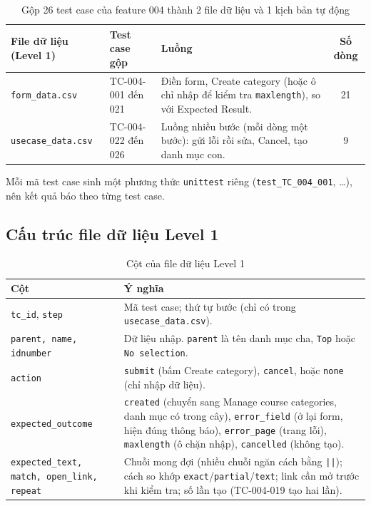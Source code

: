 \documentclass[12pt,a4paper]{article}
\begin{document}
\begin{table}[H]
\centering\small
\begin{tabular}{|L{4.0cm}|L{2.9cm}|L{4.9cm}|c|}
\hline
{}\textbf{File dữ liệu (Level 1)} & \textbf{Test case gộp} & \textbf{Luồng} & \textbf{Số dòng} \\ \hline
\texttt{form\_data.csv} & TC-004-001 đến 021 & Điền form, Create category (hoặc ô chỉ nhập để kiểm tra \texttt{maxlength}), so với Expected Result. & 21 \\ \hline
\texttt{usecase\_data.csv} & TC-004-022 đến 026 & Luồng nhiều bước (mỗi dòng một bước): gửi lỗi rồi sửa, Cancel, tạo danh mục con. & 9 \\ \hline
\end{tabular}
\caption{Gộp 26 test case của feature 004 thành 2 file dữ liệu và 1 kịch bản tự động}
\end{table}
Mỗi mã test case sinh một phương thức \texttt{unittest} riêng (\texttt{test\_TC\_004\_001}, \ldots), nên kết quả báo theo từng test case.

\subsection{Cấu trúc file dữ liệu Level 1}
\begin{table}[H]
\centering\footnotesize
\begin{tabular}{|L{4.2cm}|L{10.4cm}|}
\hline
{}\textbf{Cột} & \textbf{Ý nghĩa} \\ \hline
\texttt{tc\_id}, \texttt{step} & Mã test case; thứ tự bước (chỉ có trong \texttt{usecase\_data.csv}). \\ \hline
\texttt{parent, name, idnumber} & Dữ liệu nhập. \texttt{parent} là tên danh mục cha, \texttt{Top} hoặc \texttt{No selection}. \\ \hline
\texttt{action} & \texttt{submit} (bấm Create category), \texttt{cancel}, hoặc \texttt{none} (chỉ nhập dữ liệu). \\ \hline
\texttt{expected\_outcome} & \texttt{created} (chuyển sang Manage course categories, danh mục có trong cây), \texttt{error\_field} (ở lại form, hiện đúng thông báo), \texttt{error\_page} (trang lỗi), \texttt{maxlength} (ô chặn nhập), \texttt{cancelled} (không tạo). \\ \hline
\texttt{expected\_text, match, open\_link, repeat} & Chuỗi mong đợi (nhiều chuỗi ngăn cách bằng \texttt{||}); cách so khớp \texttt{exact}/\texttt{partial}/\texttt{text}; link cần mở trước khi kiểm tra; số lần tạo (TC-004-019 tạo hai lần). \\ \hline
\end{tabular}
\caption{Cột của file dữ liệu Level 1}
\end{table}
\end{document}
